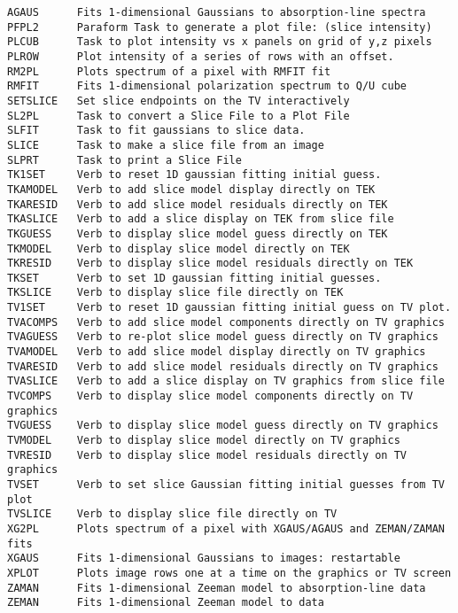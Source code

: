 \vskip 0.5pt
\bbve\begin{verbatim}
AGAUS      Fits 1-dimensional Gaussians to absorption-line spectra
PFPL2      Paraform Task to generate a plot file: (slice intensity)
PLCUB      Task to plot intensity vs x panels on grid of y,z pixels
PLROW      Plot intensity of a series of rows with an offset.
RM2PL      Plots spectrum of a pixel with RMFIT fit
RMFIT      Fits 1-dimensional polarization spectrum to Q/U cube
SETSLICE   Set slice endpoints on the TV interactively
SL2PL      Task to convert a Slice File to a Plot File
SLFIT      Task to fit gaussians to slice data.
SLICE      Task to make a slice file from an image
SLPRT      Task to print a Slice File
TK1SET     Verb to reset 1D gaussian fitting initial guess.
TKAMODEL   Verb to add slice model display directly on TEK
TKARESID   Verb to add slice model residuals directly on TEK
TKASLICE   Verb to add a slice display on TEK from slice file
TKGUESS    Verb to display slice model guess directly on TEK
TKMODEL    Verb to display slice model directly on TEK
TKRESID    Verb to display slice model residuals directly on TEK
TKSET      Verb to set 1D gaussian fitting initial guesses.
TKSLICE    Verb to display slice file directly on TEK
TV1SET     Verb to reset 1D gaussian fitting initial guess on TV plot.
TVACOMPS   Verb to add slice model components directly on TV graphics
TVAGUESS   Verb to re-plot slice model guess directly on TV graphics
TVAMODEL   Verb to add slice model display directly on TV graphics
TVARESID   Verb to add slice model residuals directly on TV graphics
TVASLICE   Verb to add a slice display on TV graphics from slice file
TVCOMPS    Verb to display slice model components directly on TV graphics
TVGUESS    Verb to display slice model guess directly on TV graphics
TVMODEL    Verb to display slice model directly on TV graphics
TVRESID    Verb to display slice model residuals directly on TV graphics
TVSET      Verb to set slice Gaussian fitting initial guesses from TV plot
TVSLICE    Verb to display slice file directly on TV
XG2PL      Plots spectrum of a pixel with XGAUS/AGAUS and ZEMAN/ZAMAN fits
XGAUS      Fits 1-dimensional Gaussians to images: restartable
XPLOT      Plots image rows one at a time on the graphics or TV screen
ZAMAN      Fits 1-dimensional Zeeman model to absorption-line data
ZEMAN      Fits 1-dimensional Zeeman model to data
\end{verbatim}\eve


